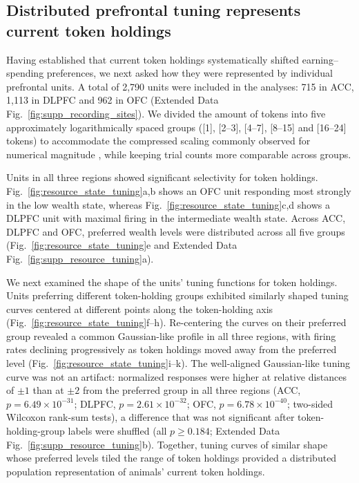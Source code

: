 \documentclass[pdflatex,sn-mathphys-num]{sn-jnl}%
\begin{document}
\subsection{Distributed prefrontal tuning represents current token holdings}
Having established that current token holdings systematically shifted earning--spending preferences, we next asked how they were represented by individual prefrontal units. A total of 2,790 units were included in the analyses: 715 in ACC, 1,113 in DLPFC and 962 in OFC (Extended Data Fig.~\ref{fig:supp_recording_sites}). We divided the amount of tokens into five approximately logarithmically spaced groups ([1], [2--3], [4--7], [8--15] and [16--24] tokens) to accommodate the compressed scaling commonly observed for numerical magnitude \cite{niederMiller2003compressed,niederDehaene2009number}, while keeping trial counts more comparable across groups. 

Units in all three regions showed significant selectivity for token holdings. Fig.~\ref{fig:resource_state_tuning}a,b shows an OFC unit responding most strongly in the low wealth state, whereas Fig.~\ref{fig:resource_state_tuning}c,d shows a DLPFC unit with maximal firing in the intermediate wealth state. Across ACC, DLPFC and OFC, preferred wealth levels were distributed across all five groups (Fig.~\ref{fig:resource_state_tuning}e and Extended Data Fig.~\ref{fig:supp_resource_tuning}a).

We next examined the shape of the units' tuning functions for token holdings. Units preferring different token-holding groups exhibited similarly shaped tuning curves centered at different points along the token-holding axis (Fig.~\ref{fig:resource_state_tuning}f--h). Re-centering the curves on their preferred group revealed a common Gaussian-like profile in all three regions, with firing rates declining progressively as token holdings moved away from the preferred level (Fig.~\ref{fig:resource_state_tuning}i--k). The well-aligned Gaussian-like tuning curve was not an artifact: normalized responses were higher at relative distances of $\pm1$ than at $\pm2$ from the preferred group in all three regions (ACC, $p=6.49\times10^{-31}$; DLPFC, $p=2.61\times10^{-32}$; OFC, $p=6.78\times10^{-40}$; two-sided Wilcoxon rank-sum tests), a difference that was not significant after token-holding-group labels were shuffled (all $p\geq0.184$; Extended Data Fig.~\ref{fig:supp_resource_tuning}b). Together, tuning curves of similar shape whose preferred levels tiled the range of token holdings provided a distributed population representation of animals' current token holdings.
\end{document}

